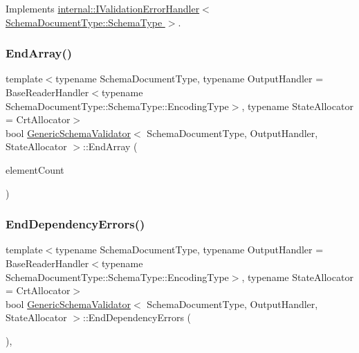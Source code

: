 Implements \hyperlink{classinternal_1_1IValidationErrorHandler_a3a0836796f39c946f31f87b80ddd6cf1}{internal\+::\+I\+Validation\+Error\+Handler$<$ Schema\+Document\+Type\+::\+Schema\+Type $>$}.

\mbox{\label{classGenericSchemaValidator_a67b501f0f65d40e0086ca8216882b34f}} 
\subsubsection{\texorpdfstring{End\+Array()}{EndArray()}}
{\footnotesize\ttfamily template$<$typename Schema\+Document\+Type, typename Output\+Handler = Base\+Reader\+Handler$<$typename Schema\+Document\+Type\+::\+Schema\+Type\+::\+Encoding\+Type$>$, typename State\+Allocator = Crt\+Allocator$>$ \\
bool \hyperlink{classGenericSchemaValidator}{Generic\+Schema\+Validator}$<$ Schema\+Document\+Type, Output\+Handler, State\+Allocator $>$\+::End\+Array (\begin{DoxyParamCaption}\item[{\hyperlink{rapidjson_8h_a5ed6e6e67250fadbd041127e6386dcb5}{Size\+Type}}]{element\+Count }\end{DoxyParamCaption})\hspace{0.3cm}{\ttfamily [inline]}}

\mbox{\label{classGenericSchemaValidator_ab6d1c964faaa0f86f9da51a0f66dc1e4}} 
\subsubsection{\texorpdfstring{End\+Dependency\+Errors()}{EndDependencyErrors()}}
{\footnotesize\ttfamily template$<$typename Schema\+Document\+Type, typename Output\+Handler = Base\+Reader\+Handler$<$typename Schema\+Document\+Type\+::\+Schema\+Type\+::\+Encoding\+Type$>$, typename State\+Allocator = Crt\+Allocator$>$ \\
bool \hyperlink{classGenericSchemaValidator}{Generic\+Schema\+Validator}$<$ Schema\+Document\+Type, Output\+Handler, State\+Allocator $>$\+::End\+Dependency\+Errors (\begin{DoxyParamCaption}{ }\end{DoxyParamCaption})\hspace{0.3cm}{\ttfamily [inline]}, {\ttfamily [virtual]}}



